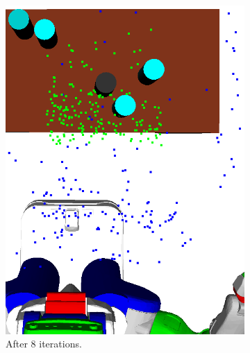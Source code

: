 \begin{figure}
\begin{subfigure}[b]{0.48\linewidth}
    \includegraphics[width=\textwidth]{images/learn8.png}
    \caption{After 8 iterations.}
  \end{subfigure}
  \begin{subfigure}[b]{0.48\linewidth}

\end{subfigure}
\end{figure}
